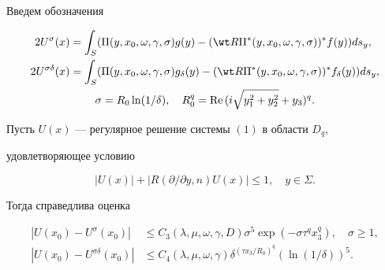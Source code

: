 Введем обозначения 


\begin{gather*} 


\begin{align*} 


2U^\sigma(x)&=\int_S(\Pi(y,x_0,\omega,\gamma,\sigma)g(y)- 


(\wt R\Pi^*(y,x_0,\omega,\gamma,\sigma))^*f(y))ds_y, \\ 


2U^{\sigma\delta}(x)&=\int_S(\Pi(y,x_0,\omega,\gamma,\sigma) 


g_\delta(y)- 


(\wt R\Pi^*(y,x_0,\omega,\gamma,\sigma))^*f_\delta(y))ds_y,


\end{align*} 


\\ 


\sigma=R_0\ln(1/\delta),\quad 


R^q_0=\text{Re\,}(i\sqrt{y^2_1+y^2_2}+y_3)^q. 


\end{gather*} 


 


\begin{thm} 


Пусть $U(x)$ --- регулярное решение системы $(1)$ в области $D_q$, 


удовлетворяющее условию 


$$ 


|U(x)|+|R(\partial/\partial y,n)U(x)|\le 1,\quad y\in\Sigma. 


$$ 


Тогда справедлива оценка 


\begin{align*} 


|U(x_0)-U^\sigma(x_0)|&\le C_3(\lambda,\mu,\omega,\gamma,D) 


\sigma^5\exp(-\sigma\tau^q x^q_3),\quad \sigma\ge 1, \\ 


|U(x_0)-U^{\sigma\delta}(x_0)|&\le C_4(\lambda,\mu,\omega,\gamma) 


\delta^{(\tau x_3/R_0)^q}(\ln(1/\delta))^5. 


\end{align*} 


\end{thm} 


 


